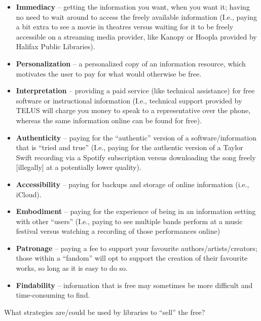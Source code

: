 \documentclass[
  letterpaper,
  DIV=11,
  numbers=noendperiod]{scrreprt}
\begin{document}
\begin{itemize}
\item
  \textbf{Immediacy} -- getting the information you want, when you want
  it; having no need to wait around to access the freely available
  information (I.e., paying a bit extra to see a movie in theatres
  versus waiting for it to be freely accessible on a streaming media
  provider, like Kanopy or Hoopla provided by Halifax Public Libraries).
  ~
\item
  \textbf{Personalization} -- a personalized copy of an information
  resource, which motivates the user to pay for what would otherwise be
  free.
\item
  \textbf{Interpretation} -- providing a paid service (like technical
  assistance) for free software or instructional information (I.e.,
  technical support provided by TELUS will charge you money to speak to
  a representative over the phone, whereas the same information online
  can be found for free).~
\item
  \textbf{Authenticity} -- paying for the ``authentic'' version of a
  software/information that is ``tried and true'' (I.e., paying for the
  authentic version of a Taylor Swift recording via a Spotify
  subscription versus downloading the song freely {[}illegally{]} at a
  potentially lower quality).
\item
  \textbf{Accessibility} -- paying for backups and storage of online
  information (i.e., iCloud).
\end{itemize}

\begin{itemize}
\item
  \textbf{Embodiment} -- paying for the experience of being in an
  information setting with other ``users'' (I.e., paying to see multiple
  bands perform at a music festival versus watching a recording of those
  performances online) ~
\item
  \textbf{Patronage} -- paying a fee to support your favourite
  authors/artists/creators; those within a ``fandom'' will opt to
  support the creation of their favourite works, so long as it is easy
  to do so.
\item
  \textbf{Findability} -- information that is free may sometimes be more
  difficult and time-consuming to find.
\end{itemize}

\begin{tcolorbox}[enhanced jigsaw, arc=.35mm, bottomrule=.15mm, bottomtitle=1mm, breakable, colback=white, colbacktitle=quarto-callout-tip-color!10!white, colframe=quarto-callout-tip-color-frame, coltitle=black, left=2mm, leftrule=.75mm, opacityback=0, opacitybacktitle=0.6, rightrule=.15mm, title=\textcolor{quarto-callout-tip-color}{\faLightbulb}\hspace{0.5em}{Pause and reflect}, titlerule=0mm, toprule=.15mm, toptitle=1mm]

What strategies are/could be used by libraries to ``sell'' the free?

\end{tcolorbox}
\end{document}
